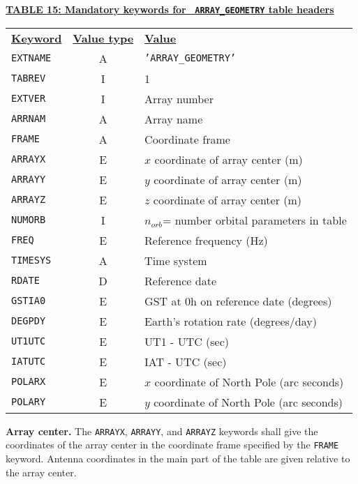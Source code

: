 \documentclass[twoside]{article}
\newcommand{\Hi}[1]{\textcolor{hicol}{#1}}
\newcommand{\norb}{$n_{orb}$}
\begin{document}
\begin{center}
\underline{\bf{TABLE \Hi{15}: Mandatory keywords for {\tt
    ARRAY\_GEOMETRY} table headers}}\\
\begin{tabular}{lcl}
\noalign{\vspace{2pt}}
\underline{{\bf Keyword}} & \underline{\bf{Value type}} &
    \underline{\bf{Value\vphantom{y}}} \\
\noalign{\vspace{2pt}} \label{ta:AGkeys}
{\tt EXTNAME}   & A & {\tt 'ARRAY\_GEOMETRY'}  \\
{\tt TABREV}    & I & 1 \\
{\tt EXTVER}    & I & Array number \\
{\tt ARRNAM}    & A & Array name \\
{\tt FRAME}     & A & Coordinate frame \\
{\tt ARRAYX}    & E & $x$ coordinate of array center \Hi{(m)} \\
{\tt ARRAYY}    & E & $y$ coordinate of array center \Hi{(m)} \\
{\tt ARRAYZ}    & E & $z$ coordinate of array center \Hi{(m)} \\
{\tt NUMORB}    & I & \norb = number orbital parameters in table \\
{\tt FREQ}      & E & Reference frequency \Hi{(Hz)} \\
{\tt TIMESYS}   & A & Time system \\
{\tt RDATE}     & D & Reference date \\
{\tt GSTIA0}    & E & GST at 0h on reference date \Hi{(degrees)} \\
{\tt DEGPDY}    & E & Earth's rotation rate \Hi{(degrees/day)} \\
{\tt UT1UTC}    & E & UT1 - UTC \Hi{(sec)} \\
{\tt IATUTC}    & E & IAT - UTC \Hi{(sec)} \\
{\tt POLARX}    & E & $x$ coordinate of North Pole \Hi{(arc seconds)} \\
{\tt POLARY}    & E & $y$ coordinate of North Pole \Hi{(arc seconds)}
\end{tabular}
\end{center}

{\bf Array center.} The {\tt ARRAYX}, {\tt ARRAYY}, and {\tt ARRAYZ}
keywords shall give the coordinates of the array center in the
coordinate frame specified by the {\tt FRAME} keyword.  Antenna
coordinates in the main part of the table are given relative to the
array center.
\end{document}
